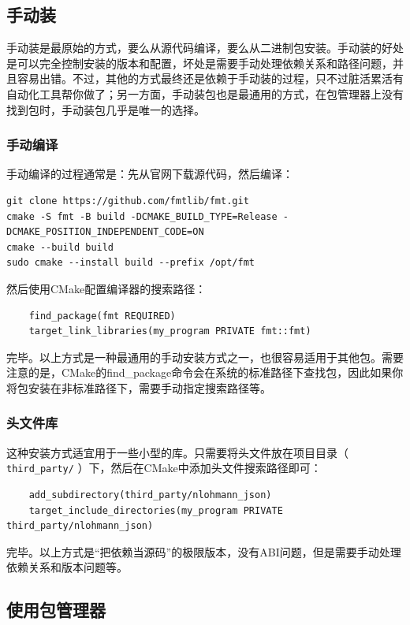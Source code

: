 \subsection{手动装}

手动装是最原始的方式，要么从源代码编译，要么从二进制包安装。手动装的好处是可以完全控制安装的版本和配置，坏处是需要手动处理依赖关系和路径问题，并且容易出错。不过，其他的方式最终还是依赖于手动装的过程，只不过脏活累活有自动化工具帮你做了；另一方面，手动装包也是最通用的方式，在包管理器上没有找到包时，手动装包几乎是唯一的选择。

\subsubsection{手动编译}

手动编译的过程通常是：先从官网下载源代码，然后编译：
\begin{verbatim}
git clone https://github.com/fmtlib/fmt.git
cmake -S fmt -B build -DCMAKE_BUILD_TYPE=Release -DCMAKE_POSITION_INDEPENDENT_CODE=ON
cmake --build build
sudo cmake --install build --prefix /opt/fmt
\end{verbatim}

然后使用CMake配置编译器的搜索路径：
\begin{verbatim}
    find_package(fmt REQUIRED)
    target_link_libraries(my_program PRIVATE fmt::fmt)
\end{verbatim}

完毕。以上方式是一种最通用的手动安装方式之一，也很容易适用于其他包。需要注意的是，CMake的find\_package命令会在系统的标准路径下查找包，因此如果你将包安装在非标准路径下，需要手动指定搜索路径等。

\subsubsection{头文件库}

这种安装方式适宜用于一些小型的库。只需要将头文件放在项目目录（ \texttt{third\_party/} ）下，然后在CMake中添加头文件搜索路径即可：
\begin{verbatim}
    add_subdirectory(third_party/nlohmann_json)
    target_include_directories(my_program PRIVATE third_party/nlohmann_json)
\end{verbatim}

完毕。以上方式是“把依赖当源码”的极限版本，没有ABI问题，但是需要手动处理依赖关系和版本问题等。

\subsection{使用包管理器}


